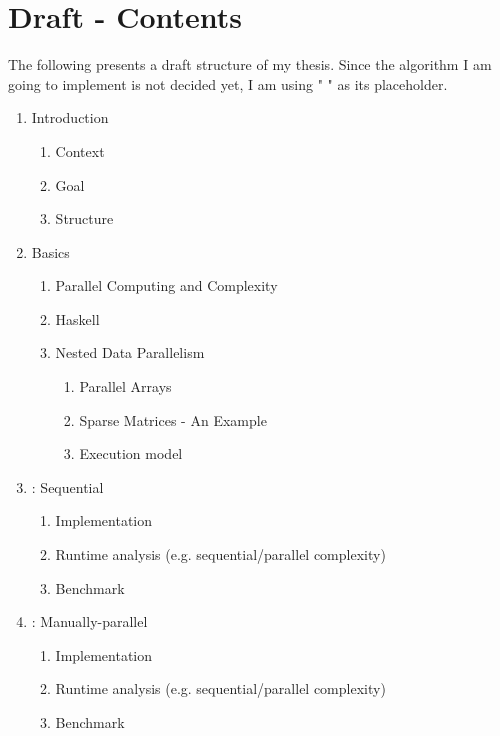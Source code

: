\message{ !name(expose.tex)}\documentclass{article}
\begin{document}
    \section{Draft - Contents}

        The following presents a draft structure of my thesis.
        Since the algorithm I am going to implement is not decided yet, I am using " " as its placeholder.

        \begin{enumerate}

        \item Introduction
            \begin{enumerate}
            \item Context
            \item Goal
            \item Structure
            \end{enumerate}

        \item Basics
            \begin{enumerate}
            \item Parallel Computing and Complexity
            \item Haskell
            \item Nested Data Parallelism
                \begin{enumerate}
                \item Parallel Arrays
                \item Sparse Matrices - An Example
                \item Execution model
                \end{enumerate}
            \end{enumerate}

        \item   : Sequential
            \begin{enumerate}
            \item Implementation
            \item Runtime analysis {\tiny (e.g. sequential/parallel complexity)}
            \item Benchmark
            \end{enumerate}

        \item   : Manually-parallel
            \begin{enumerate}
            \item Implementation
            \item Runtime analysis {\tiny (e.g. sequential/parallel complexity)}
            \item Benchmark
            \end{enumerate}


\end{enumerate}
\end{document}
